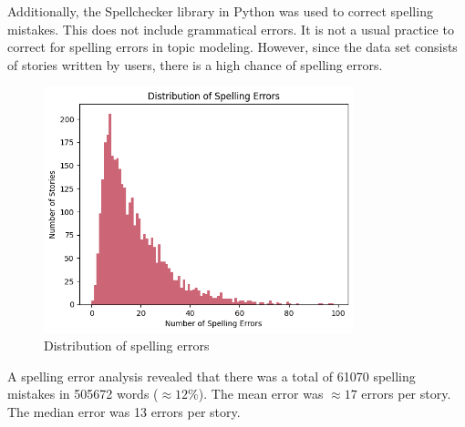 Additionally, the Spellchecker library in Python was used to correct spelling mistakes. This does not include grammatical errors. It is not a usual practice to correct for spelling errors in topic modeling. However, since the data set consists of stories written by users, there is a high chance of spelling errors. 

\begin{figure}[h]
    \centering
    \includegraphics[width=0.8\textwidth]{resources/spelling_mistakes_distribution.png}
    \caption{Distribution of spelling errors}
    \label{fig:spelling_error_distribution}
\end{figure}


A spelling error analysis revealed that there was a total of 61070 spelling mistakes in 505672 words ($\approx 12\%$). The mean error was $\approx17$ errors per story. The median error was 13 errors per story.